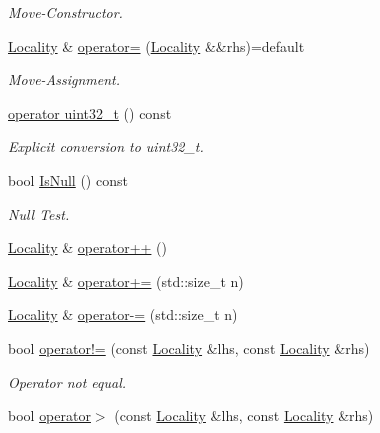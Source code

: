 \begin{DoxyCompactItemize}
\begin{DoxyCompactList}\small\item\em Move-\/\-Constructor. \end{DoxyCompactList}\item 
\hyperlink{classshad_1_1rt_1_1Locality}{Locality} \& \hyperlink{classshad_1_1rt_1_1Locality_a8662089df9212947bcc895ca42aa559c}{operator=} (\hyperlink{classshad_1_1rt_1_1Locality}{Locality} \&\&rhs)=default
\begin{DoxyCompactList}\small\item\em Move-\/\-Assignment. \end{DoxyCompactList}\item 
\hyperlink{classshad_1_1rt_1_1Locality_a59c6ecb89129520f9a8d9619f25f6b2c}{operator uint32\-\_\-t} () const 
\begin{DoxyCompactList}\small\item\em Explicit conversion to uint32\-\_\-t. \end{DoxyCompactList}\item 
bool \hyperlink{classshad_1_1rt_1_1Locality_ad85f3d8427e07bf8a07bd9b0ca482096}{Is\-Null} () const 
\begin{DoxyCompactList}\small\item\em Null Test. \end{DoxyCompactList}\item 
\hyperlink{classshad_1_1rt_1_1Locality}{Locality} \& \hyperlink{classshad_1_1rt_1_1Locality_aad64f6e45b3083a552aec0dd2c582c1e}{operator++} ()
\item 
\hyperlink{classshad_1_1rt_1_1Locality}{Locality} \& \hyperlink{classshad_1_1rt_1_1Locality_a22f1d152384124ac1f78c8fc5e359f3f}{operator+=} (std\-::size\-\_\-t n)
\item 
\hyperlink{classshad_1_1rt_1_1Locality}{Locality} \& \hyperlink{classshad_1_1rt_1_1Locality_aa550d9488262a580dc553350eccf75ba}{operator-\/=} (std\-::size\-\_\-t n)
\item 
bool \hyperlink{classshad_1_1rt_1_1Locality_a71b4448d929b976967fa6cdc081e9f05}{operator!=} (const \hyperlink{classshad_1_1rt_1_1Locality}{Locality} \&lhs, const \hyperlink{classshad_1_1rt_1_1Locality}{Locality} \&rhs)
\begin{DoxyCompactList}\small\item\em Operator not equal. \end{DoxyCompactList}\item 
bool \hyperlink{classshad_1_1rt_1_1Locality_a53d34516e59a139d2741d796ee2958c6}{operator$>$} (const \hyperlink{classshad_1_1rt_1_1Locality}{Locality} \&lhs, const \hyperlink{classshad_1_1rt_1_1Locality}{Locality} \&rhs)

\end{DoxyCompactItemize}
